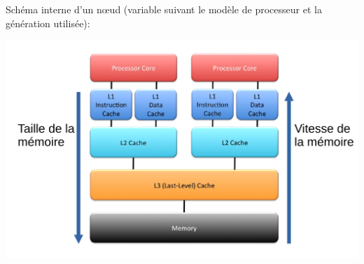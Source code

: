 \documentclass{beamer}
\begin{document}
\begin{frame}
Schéma interne d'un n\oe ud (variable suivant le mod\`ele de processeur et la g\'en\'eration utilis\'ee):

\begin{center}
\includegraphics[scale=0.32]{../../Images/NoeudCalcul}
\end{center}

\end{frame}
\end{document}
